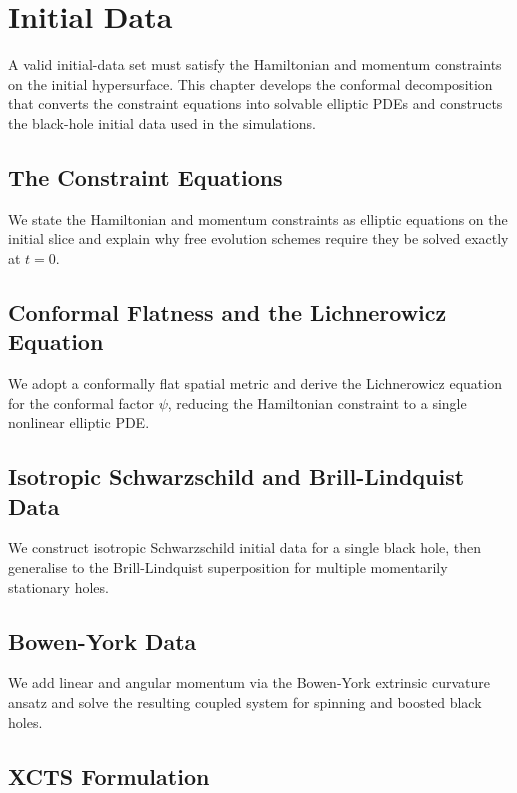 \chapter{Initial Data}
\label{ch:initial-data}

A valid initial-data set must satisfy the Hamiltonian and momentum constraints
on the initial hypersurface. This chapter develops the conformal decomposition
that converts the constraint equations into solvable elliptic PDEs and constructs
the black-hole initial data used in the simulations.

\section{The Constraint Equations}
\label{sec:id-constraints}

We state the Hamiltonian and momentum constraints as elliptic equations on the
initial slice and explain why free evolution schemes require they be solved
exactly at $t=0$.

\section{Conformal Flatness and the Lichnerowicz Equation}
\label{sec:id-conformal-flat}

We adopt a conformally flat spatial metric and derive the Lichnerowicz equation
for the conformal factor $\psi$, reducing the Hamiltonian constraint to a
single nonlinear elliptic PDE.

\section{Isotropic Schwarzschild and Brill-Lindquist Data}
\label{sec:id-brill-lindquist}

We construct isotropic Schwarzschild initial data for a single black hole,
then generalise to the Brill-Lindquist superposition for multiple momentarily
stationary holes.

\section{Bowen-York Data}
\label{sec:id-bowen-york}

We add linear and angular momentum via the Bowen-York extrinsic curvature
ansatz and solve the resulting coupled system for spinning and boosted
black holes.

\section{XCTS Formulation\starmark{}}
\label{sec:id-xcts}

